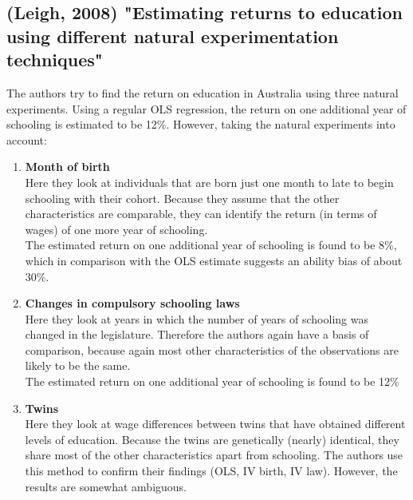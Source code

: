 \documentclass[12pt,a4paper]{article}
\begin{document}
  \subsection{(Leigh, 2008) "Estimating returns to education using different natural experimentation techniques"} %
  \label{sub:leigh}
  The authors try to find the return on education in Australia using three natural experiments. Using a regular
  OLS regression, the return on one additional year of schooling is estimated to be 12\%. However, taking
  the natural experiments into account:
  \begin{enumerate}
    \item \textbf{Month of birth}\\
          Here they look at individuals that are born just one month to late to begin schooling with their cohort.
          Because they assume that the other characteristics are comparable, they can identify the return (in terms of wages)
          of one more year of schooling.\\
          The estimated return on one additional year of schooling is found to be 8\%, which in comparison with the OLS
          estimate suggests an ability bias of about 30\%.
    \item \textbf{Changes in compulsory schooling laws}\\
          Here they look at years in which the number of years of schooling was changed in the legislature.
          Therefore the authors again have a basis of comparison, because again most other characteristics of the
          observations are likely to be the same.\\
          The estimated return on one additional year of schooling is found to be 12\%
    \item \textbf{Twins}\\
          Here they look at wage differences between twins that have obtained different levels of education.
          Because the twins are genetically (nearly) identical, they share most of the other characteristics
          apart from schooling. The authors use this method to confirm their findings (OLS, IV birth, IV law).
          However, the results are somewhat ambiguous.
  \end{enumerate}
\end{document}
